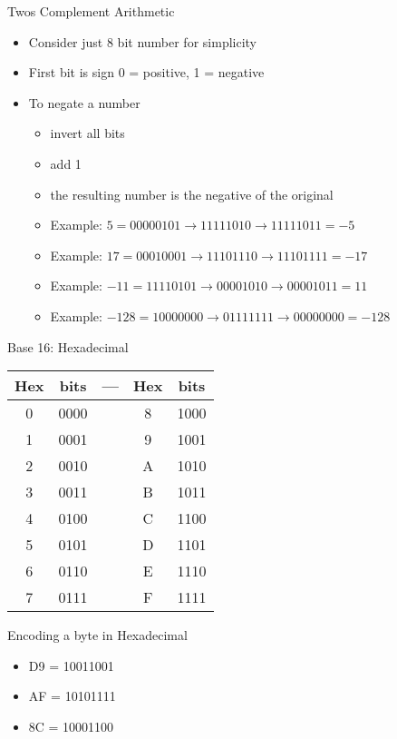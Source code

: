 \begin{withoutheadline}
\begin{frame}[fragile]{Twos Complement Arithmetic}
\begin{itemize}
    \item Consider just 8 bit number for simplicity
    \item First bit is sign 0 = positive, 1 = negative
    \item To negate a number
    \begin{itemize}
        \item invert all bits
        \item add 1
        \item the resulting number is the negative of the original
        \item Example: $   5 = 00000101 \to 11111010 \to 11111011 = -5$
        \item Example: $  17 = 00010001 \to 11101110 \to 11101111 = -17$
        \item Example: $ -11 = 11110101 \to 00001010 \to 00001011 = 11$
        \item Example: $-128 = 10000000 \to 01111111 \to 00000000 = -128$
    \end{itemize}
\end{itemize}
\end{frame}

\begin{frame}[fragile]{Base 16: Hexadecimal}
\begin{tabular}{c|c|c|c|c} \toprule
    Hex & bits & --- & Hex & bits  \\ \midrule 
    0 & 0000 & & 8 & 1000 \\
    1 & 0001 & & 9 & 1001 \\
    2 & 0010 & & A & 1010 \\
    3 & 0011 & & B & 1011 \\
    4 & 0100 & & C & 1100 \\
    5 & 0101 & & D & 1101 \\
    6 & 0110 & & E & 1110 \\
    7 & 0111 & & F & 1111 \\    \bottomrule
\end{tabular}
\end{frame}
    
\begin{frame}{Encoding a byte in Hexadecimal}
\begin{itemize}
    \item D9 = 10011001
    \item AF = 10101111
    \item 8C = 10001100
\end{itemize}
\end{frame}


\end{withoutheadline}
